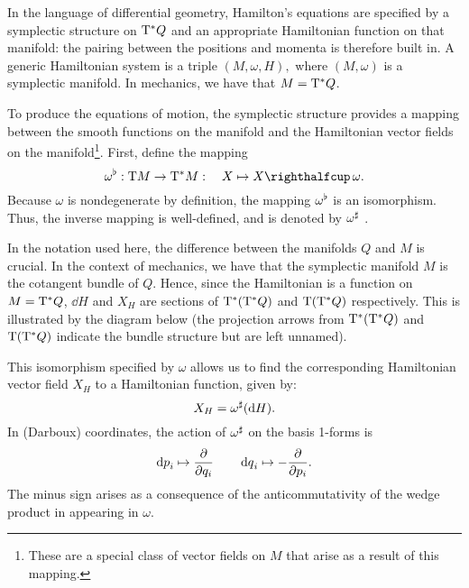 In the language of differential geometry, Hamilton's equations are specified by a symplectic structure on $\mathrm{T}^*Q$ and an appropriate Hamiltonian function on that manifold: the pairing between the positions and momenta is therefore built in. A generic Hamiltonian system is a triple $ (M, \omega, H), $ where $ (M, \omega) $ is a symplectic manifold. In mechanics, we have that $ M = \mathrm{T}^*Q $.

To produce the equations of motion, the symplectic structure provides a mapping between the smooth functions on the manifold and the Hamiltonian vector fields on the manifold\footnote{These are a special class of vector fields on $M$ that arise as a result of this mapping.}. First, define the mapping 
$$ \toDual{\omega}: \tbundle{M} \to \ctbundle{M}:\quad X \mapsto \intpr{X}{\omega}. $$
Because $\omega$ is nondegenerate by definition, the mapping $\omega^\flat$ is an isomorphism. Thus, the inverse mapping is well-defined, and is denoted by $\omega^\sharp$ \cite{Libermann1987}.

In the notation used here, the difference between the manifolds $Q$ and $M$ is crucial. In the context of mechanics, we have that the symplectic manifold $M$ is the cotangent bundle of $Q$. Hence, since the Hamiltonian is a function on $M = \mathrm{T}^*Q$, $\dd{H}$ and $X_H$ are sections of $\mathrm{T}^*\qty(\mathrm{T}^*Q)$ and $\mathrm{T}\qty(\mathrm{T}^*Q)$ respectively. This is illustrated by the diagram below (the projection arrows from $\mathrm{T}^*\qty(\mathrm{T}^*Q)$ and $\mathrm{T}\qty(\mathrm{T}^*Q)$ indicate the bundle structure but are left unnamed).
\begin{center}
\end{center}
This isomorphism specified by $\omega$ allows us to find the corresponding Hamiltonian vector field $X_H$ to a Hamiltonian function, given by:
$$ X_H = \omega^\sharp(\dd{H}). $$
In (Darboux) coordinates, the action of $ \omega^\sharp$ on the basis 1-forms is  
$$ \dd{p}_i \mapsto \pdv{}{q_i} \qquad \dd{q}_i \mapsto -\pdv{}{p_i}. $$ 
The minus sign arises as a consequence of the anticommutativity of the wedge product in appearing in $\omega$.

